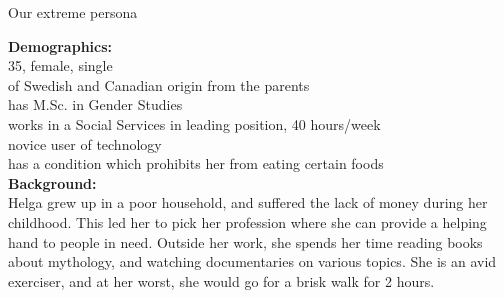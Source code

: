 \documentclass[a4paper,10pt,oneside]{scrreprt}
\begin{document}
		Our extreme persona

		\begin{mdframed}
			\begin{minipage}{\textwidth}
				\begin{figure}
					\centering
					\vspace{-4cm}
				\end{figure}


				\textbf{Demographics:}\\
				35, female, single\\
				of Swedish and Canadian origin from the parents\\
				has M.Sc. in Gender Studies\\
				works in a Social Services in leading position, 40 hours/week\\
				novice user of technology\\
				has a condition which prohibits her from eating certain foods\\

				\textbf{Background:}\\
				Helga grew up in a poor household, and suffered the lack of money during her childhood. This led her to pick her profession where she can provide a helping hand to people in need. Outside her work, she spends her time reading books about mythology, and watching documentaries on various topics. She is an avid exerciser, and at her worst, she would go for a brisk walk for 2 hours.\\





\end{minipage}
\end{mdframed}
\end{document}
